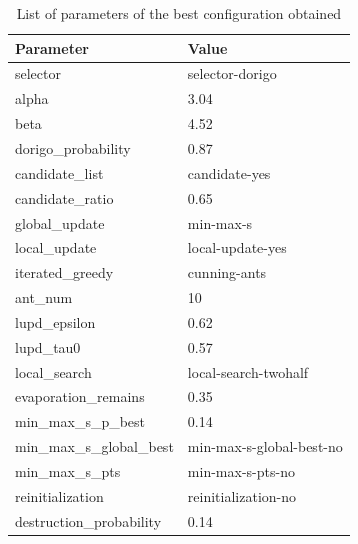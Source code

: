 \documentclass[12pt,a4paper,oneside]{book}
\begin{document}
\begin{table}[]
\centering
\caption{List of parameters of the best configuration obtained}
\label{tbl:obtained}
\begin{tabular}{|l|l|}
\hline
\textbf{Parameter}       & \textbf{Value}         \\ \hline
selector                 & selector-dorigo        \\ \hline
alpha                    & 3.04                   \\ \hline
beta                     & 4.52                   \\ \hline
dorigo\_probability      & 0.87                   \\ \hline
candidate\_list          & candidate-yes          \\ \hline
candidate\_ratio         & 0.65                   \\ \hline
global\_update           & min-max-s              \\ \hline
local\_update            & local-update-yes       \\ \hline
iterated\_greedy         & cunning-ants           \\ \hline
ant\_num                 & 10                     \\ \hline
lupd\_epsilon            & 0.62                   \\ \hline
lupd\_tau0               & 0.57                   \\ \hline
local\_search            & local-search-twohalf   \\ \hline
evaporation\_remains     & 0.35                   \\ \hline
min\_max\_s\_p\_best     & 0.14                   \\ \hline
min\_max\_s\_global\_best & min-max-s-global-best-no  \\ \hline
min\_max\_s\_pts         & min-max-s-pts-no       \\ \hline
reinitialization         & reinitialization-no    \\ \hline
destruction\_probability & 0.14                   \\ \hline
\end{tabular}
\end{table}
\end{document}
